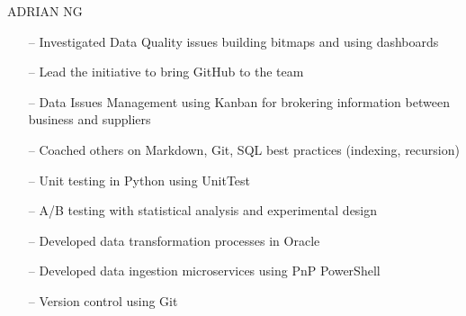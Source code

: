 \documentclass[10pt,a4paper]{altacv}
\begin{document}
\tagline{}

%

\begin{fullwidth}
\namefont\color{name}\MakeUppercase{Adrian Ng}\par
\end{fullwidth}

%





\begin{itemize}
    \setlength{\itemindent}{0.5em}
    \item[--]   \small{Investigated Data Quality issues building bitmaps and using dashboards}
    \item[--]   \small{Lead the initiative to bring GitHub to the team}
    \item[--]   \small{Data Issues Management using Kanban for brokering information between business and suppliers}
    \item[--]   \small{Coached others on Markdown, Git, SQL best practices (indexing, recursion)}
    \item[--]   \small{Unit testing in Python using UnitTest} 
    \item[--]   \small{A/B testing with statistical analysis and experimental design}  
\end{itemize}

\medskip




\begin{itemize}
    \setlength{\itemindent}{0.5em}
    \item[--]   \small{Developed data transformation processes in Oracle}
    \item[--]   \small{Developed data ingestion microservices using PnP PowerShell}
    \item[--]   \small{Version control using Git}
\end{itemize}
\end{document}
